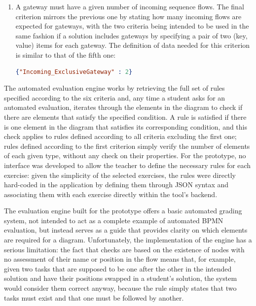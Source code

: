 \begin{enumerate}
\begin{lstlisting}[language=json,firstnumber=1]
    {"Outgoing_ExclusiveGateway" : 2}
    \end{lstlisting}
    \item A gateway must have a given number of incoming sequence flows. The final criterion mirrors the previous one by stating how many incoming flows are expected for gateways, with the two criteria being intended to be used in the same fashion if a solution includes gateways by specifying a pair of two (key, value) items for each gateway. The definition of data needed for this criterion is similar to that of the fifth one:
    \begin{lstlisting}[language=json,firstnumber=1]
    {"Incoming_ExclusiveGateway" : 2}
    \end{lstlisting}
\end{enumerate}

The automated evaluation engine works by retrieving the full set of rules specified according to the six criteria and, any time a student asks for an automated evaluation, iterates through the elements in the diagram to check if there are elements that satisfy the specified condition. A rule is satisfied if there is one element in the diagram that satisfies its corresponding condition, and this check applies to rules defined according to all criteria excluding the first one; rules defined according to the first criterion simply verify the number of elements of each given type, without any check on their properties. For the prototype, no interface was developed to allow the teacher to define the necessary rules for each exercise: given the simplicity of the selected exercises, the rules were directly hard-coded in the application by defining them through JSON syntax and associating them with each exercise directly within the tool's backend. 

The evaluation engine built for the prototype offers a basic automated grading system, not intended to act as a complete example of automated BPMN evaluation, but instead serves as a guide that provides clarity on which elements are required for a diagram. Unfortunately, the implementation of the engine has a serious limitation: the fact that checks are based on the existence of nodes with no assessment of their name or position in the flow means that, for example, given two tasks that are supposed to be one after the other in the intended solution and have their positions swapped in a student's solution, the system would consider them correct anyway, because the rule simply states that two tasks must exist and that one must be followed by another.

